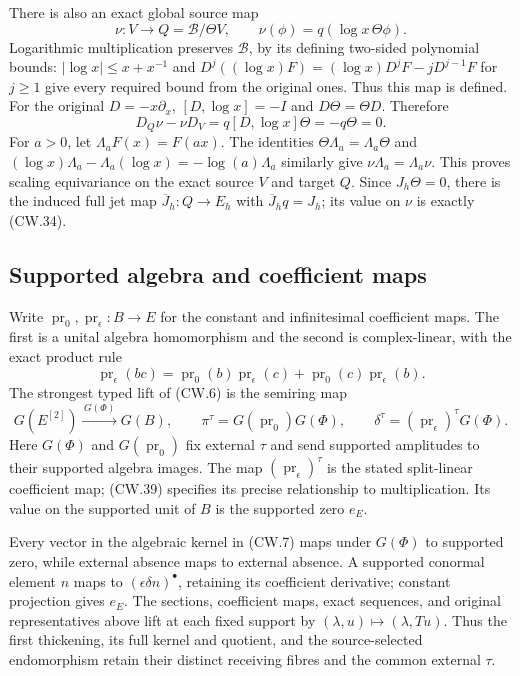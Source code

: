 There is also an exact global source map
\[
 \nu:V\to Q=\mathscr B/\Theta V,\qquad
 \nu(\phi)=q(\log x\,\Theta\phi).
 \tag{CW.37}
\]
Logarithmic multiplication preserves \(\mathscr B\), by its
defining two-sided polynomial bounds: \(|\log x|\le x+x^{-1}\)
and
\(D^j((\log x)F)=(\log x)D^jF-jD^{j-1}F\) for \(j\ge1\)
give every required bound from the original ones.
Thus this map is defined.
For the original \(D=-x\partial_x\),
\([D,\log x]=-I\) and \(D\Theta=\Theta D\).
Therefore
\[
 D_Q\nu-\nu D_V=q[D,\log x]\Theta=-q\Theta=0 .
 \tag{CW.38}
\]
For \(a>0\), let \(\Lambda_aF(x)=F(ax)\).
The identities \(\Theta\Lambda_a=\Lambda_a\Theta\) and
\((\log x)\Lambda_a-\Lambda_a(\log x)
      =-\log(a)\Lambda_a\) similarly give
\(\nu\Lambda_a=\Lambda_a\nu\).
This proves scaling equivariance on the exact source \(V\)
and target \(Q\).  Since \(J_h\Theta=0\), there is the
induced full jet map \(\overline J_h:Q\to E_h\) with
\(\overline J_hq=J_h\); its value on \(\nu\) is exactly
(CW.34).

\subsection{Supported algebra and coefficient maps}

Write \(\operatorname{pr}_0,\operatorname{pr}_\epsilon:B\to E\)
for the constant and infinitesimal coefficient maps.
The first is a unital algebra homomorphism and the second
is complex-linear, with the exact product rule
\[
 \operatorname{pr}_\epsilon(bc)
   =\operatorname{pr}_0(b)\operatorname{pr}_\epsilon(c)
       +\operatorname{pr}_0(c)\operatorname{pr}_\epsilon(b).
 \tag{CW.39}
\]
The strongest typed lift of (CW.6) is the semiring map
\[
 G(E^{[2]})\xrightarrow{\,G(\Phi)\,}G(B),\qquad
 \pi^\tau=G(\operatorname{pr}_0)G(\Phi),\qquad
 \delta^\tau=(\operatorname{pr}_\epsilon)^\tau G(\Phi).
 \tag{CW.40}
\]
Here \(G(\Phi)\) and \(G(\operatorname{pr}_0)\) fix
external \(\tau\) and send supported amplitudes to their
supported algebra images.  The map
\((\operatorname{pr}_\epsilon)^\tau\) is the stated
split-linear coefficient map; (CW.39) specifies its precise
relationship to multiplication.
Its value on the supported unit of \(B\) is the supported
zero \(e_E\).

Every vector in the algebraic kernel in (CW.7) maps under
\(G(\Phi)\) to supported zero, while external absence maps
to external absence.  A supported conormal element \(n\)
maps to \((\epsilon\delta n)^\bullet\), retaining its
coefficient derivative; constant projection gives \(e_E\).
The sections, coefficient maps, exact sequences, and original
representatives above lift at each fixed support by
\((\lambda,u)\mapsto(\lambda,Tu)\).
Thus the first thickening, its full kernel and quotient,
and the source-selected endomorphism retain their distinct
receiving fibres and the common external \(\tau\).

